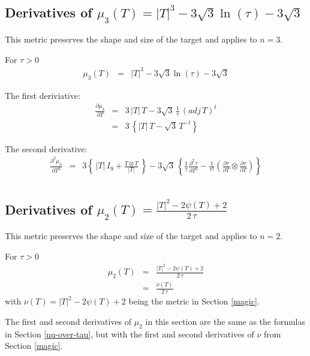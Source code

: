 \documentclass{report}
\begin{document}
\subsection{Derivatives of $\mu_3(T)=|T|^3 - 3 \sqrt{3} \ln(\tau) - 3 \sqrt{3}$ \label{ss+23d}}

\noindent This metric preserves the shape and size of the target and applies
to $n=3$. \newline

\noindent For $\tau>0$
\begin{eqnarray}
\mu_3(T) & = & |T|^3 - 3 \sqrt{3} \ln(\tau) - 3 \sqrt{3} 
\end{eqnarray}

\noindent The first deriviative:
\begin{eqnarray}
\frac{\partial \mu_3}{\partial T} & = & 3 \, |T| \, T - 3 \sqrt{3} \, \frac{1}{\tau} \, (adj \, T)^t \\
 & = & 3 \, \left\{ |T| \, T - \sqrt{3} \, T^{-t} \right\}
\end{eqnarray}

\noindent The second derivative:
\begin{eqnarray}
\frac{\partial^2 \mu_3}{\partial T^2} & = & 3 \left\{ \, |T| \, I_{9} + \frac{T \otimes T}{|T|} \, \right\} - 3 \sqrt{3} \, \left\{ \frac{1}{\tau} \frac{\partial^2 \tau}{\partial T^2} - \frac{1}{\tau^2} \left( \frac{\partial \tau}{\partial T} \otimes \frac{\partial \tau}{\partial T} \right) \right\} \nonumber \\
\end{eqnarray}

\subsection{Derivatives of $\mu_2(T)=\frac{|T|^2-2 \psi(T)+2}{2 \, \tau}$ \label{ss+32d}}

\noindent This metric preserves the shape and size of the target and applies
to $n=2$. \newline

\noindent For $\tau>0$
\begin{eqnarray}
\mu_2(T) & = & \frac{|T|^2-2 \psi(T)+2}{2 \, \tau} \\
         & = & \frac{\nu(T)}{2 \, \tau}
\end{eqnarray}
with $\nu(T) = |T|^2 - 2 \psi(T) + 2$ being the metric in Section \ref{magic}. 
 \newline

\noindent The first and second derivatives of $\mu_2$ in this section are the 
same as the formulas in Section \ref{nu-over-tau}, but with the first and 
second derivatives of $\nu$ from Section \ref{magic}.  \newline
\end{document}
